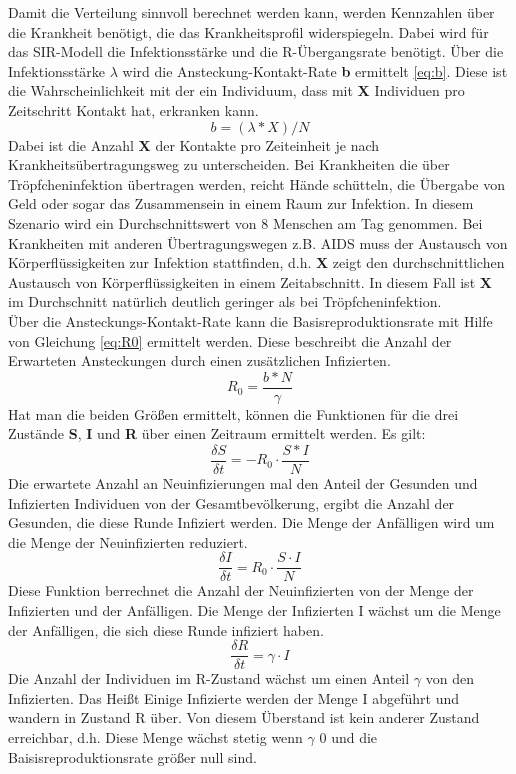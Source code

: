 Damit die Verteilung sinnvoll berechnet werden kann, werden Kennzahlen über die Krankheit benötigt, die das Krankheitsprofil widerspiegeln. Dabei wird für das SIR-Modell die Infektionsstärke und die \glqq R\grqq{}-Übergangsrate benötigt.
Über die Infektionsstärke $\lambda$ wird die Ansteckung-Kontakt-Rate \textbf{b} ermittelt \ref{eq:b}. Diese ist die Wahrscheinlichkeit mit der ein Individuum, dass mit \textbf{X} Individuen pro Zeitschritt Kontakt hat, erkranken kann.
\begin{equation} \label{eq:b}
b = ( \lambda * X ) / N
\end{equation}
Dabei ist die Anzahl \textbf{X} der Kontakte pro Zeiteinheit je nach Krankheitsübertragungsweg zu unterscheiden. Bei Krankheiten die über Tröpfcheninfektion übertragen werden, reicht Hände schütteln, die Übergabe von Geld oder sogar das Zusammensein in einem Raum zur Infektion. In diesem Szenario wird ein Durchschnittswert von 8 Menschen am Tag genommen.
Bei Krankheiten mit anderen Übertragungswegen z.B. AIDS muss der Austausch von Körperflüssigkeiten zur Infektion stattfinden, d.h. \textbf{X} zeigt den durchschnittlichen Austausch von Körperflüssigkeiten in einem Zeitabschnitt. In diesem Fall ist \textbf{X} im Durchschnitt natürlich deutlich geringer als bei Tröpfcheninfektion.\\
Über die Ansteckungs-Kontakt-Rate kann die Basisreproduktionsrate   mit Hilfe von Gleichung \ref{eq:R0} ermittelt werden. Diese beschreibt die Anzahl der Erwarteten Ansteckungen durch einen zusätzlichen Infizierten.
\begin{equation}\label{eq:R0}
R_0 = \frac{ b * N }{ \gamma }
\end{equation}
Hat man die beiden Größen ermittelt, können die Funktionen für die drei Zustände \textbf{S}, \textbf{I} und \textbf{R} über einen Zeitraum ermittelt werden. 
Es gilt:
\begin{equation}
\frac{ \delta S }{ \delta t } = -R_0 \cdot \frac{S * I}{N}
\end{equation}
Die erwartete Anzahl an Neuinfizierungen mal den Anteil der Gesunden und Infizierten Individuen von der Gesamtbevölkerung, ergibt die Anzahl der Gesunden, die diese Runde Infiziert werden. Die Menge der Anfälligen wird um die Menge der Neuinfizierten reduziert.
\begin{equation}
\frac{\delta I }{\delta t} = R_0 \cdot \frac{S \cdot I}{N}
\end{equation}
Diese Funktion berrechnet die Anzahl der Neuinfizierten von der Menge der Infizierten und der Anfälligen. Die Menge der Infizierten I wächst um die Menge der Anfälligen, die sich diese Runde infiziert haben.
\begin{equation}
\frac{\delta R }{\delta t} = \gamma \cdot I
\end{equation}
Die Anzahl der Individuen im R-Zustand wächst um einen Anteil $\gamma$ von den Infizierten. Das Heißt Einige Infizierte werden der Menge I abgeführt und wandern in Zustand R über. Von diesem Überstand ist kein anderer Zustand erreichbar, d.h. Diese Menge wächst stetig wenn $\gamma$ 0 und die Baisisreproduktionsrate größer null sind.

